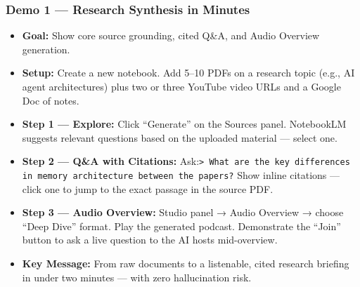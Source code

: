 \begin{frame}[fragile]\frametitle{Demo 1 — Research Synthesis in Minutes}
  \begin{itemize}
    \item \textbf{Goal:} Show core source grounding, cited Q\&A, and Audio Overview generation.
    \item \textbf{Setup:} Create a new notebook. Add 5--10 PDFs on a research topic (e.g., AI agent architectures) plus two or three YouTube video URLs and a Google Doc of notes.
    \item \textbf{Step 1 — Explore:} Click ``Generate'' on the Sources panel. NotebookLM suggests relevant questions based on the uploaded material — select one.
    \item \textbf{Step 2 — Q\&A with Citations:} Ask:\lstinline|> What are the key differences in memory architecture between the papers?|
    Show inline citations — click one to jump to the exact passage in the source PDF.
    \item \textbf{Step 3 — Audio Overview:} Studio panel → Audio Overview → choose ``Deep Dive'' format. Play the generated podcast. Demonstrate the ``Join'' button to ask a live question to the AI hosts mid-overview.
    \item \textbf{Key Message:} From raw documents to a listenable, cited research briefing in under two minutes — with zero hallucination risk.
  \end{itemize}
\end{frame}


